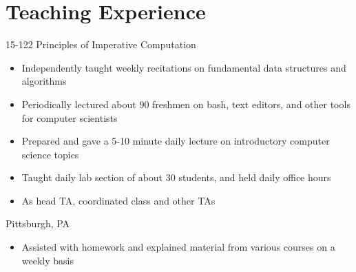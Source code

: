 \documentclass[11pt,letterpaper,sans,final]{moderncv}
\begin{document}
\section{Teaching Experience}
    {15-122 Principles of Imperative Computation}{}{}
    {
      \begin{itemize}
        \item Independently taught weekly recitations on fundamental data
          structures and algorithms
      \end{itemize}
    }
    {
      \begin{itemize}
        \item Periodically lectured about 90 freshmen on bash, text editors,
          and other tools for computer scientists
      \end{itemize}
    }
    {
      \begin{itemize}
        \item Prepared and gave a 5-10 minute daily lecture on
          introductory computer science topics
        \item Taught daily lab section of about 30 students, and held daily
          office hours
      \end{itemize}
    }
    {
      \begin{itemize}
        \item As head TA, coordinated class and other TAs
      \end{itemize}
    }
    {Pittsburgh, PA}{}{
    \begin{itemize}
      \item Assisted with homework and explained material from various courses
        on a weekly basis
    \end{itemize}
    }
\end{document}
